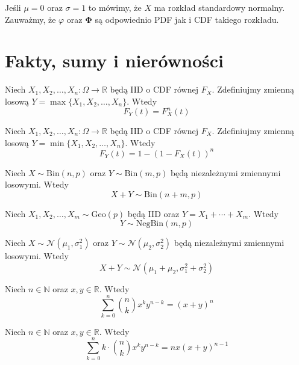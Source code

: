 Jeśli $\mu = 0$ oraz $\sigma = 1$ to mówimy, że $X$ ma rozkład standardowy normalny. Zauważmy, że $\varphi$ oraz $\mathbf{\Phi}$ są odpowiednio PDF jak i CDF takiego rozkładu.

\section{Fakty, sumy i nierówności}

\begin{fact}\label{fact:max_CDF}
Niech $X_1,X_2,\dots, X_n:\Omega\to\mathbb{R}$ będą IID o CDF równej $F_X$. Zdefiniujmy zmienną losową $Y = \max\{X_1,X_2,\dots, X_n\}$. Wtedy 
\[
    F_Y(t)=F_X^n(t)
\]
\end{fact}

\begin{fact}\label{fact:min_CDF}
Niech $X_1,X_2,\dots, X_n:\Omega\to\mathbb{R}$ będą IID o CDF równej $F_X$. Zdefiniujmy zmienną losową $Y = \min\{X_1,X_2,\dots, X_n\}$. Wtedy 
\[
    F_Y(t)=1-{(1-F_X(t))}^n
\]
\end{fact}

\begin{fact}\label{fact:sum_of_bin_RV}
Niech $X \sim \mathrm{Bin}(n,p)$ oraz $Y \sim \mathrm{Bin}(m,p)$ będą niezależnymi zmiennymi losowymi. Wtedy 
\[
    X + Y \sim \mathrm{Bin}(n+m, p)
\]
\end{fact}

\begin{fact}\label{fact:sum_of_geo_RV}
Niech $X_1, X_2, \dots, X_m \sim \mathrm{Geo}(p)$ będą IID oraz $Y=X_1 +  \cdots + X_m$. Wtedy 
\[
    Y \sim \mathrm{NegBin}(m, p)
\]
\end{fact}

\begin{fact}\label{fact:sum_of_normal_RV}
Niech $X \sim \mathcal{N}(\mu_1,\sigma_1^2)$ oraz $Y \sim \mathcal{N}(\mu_2,\sigma_2^2)$ będą niezależnymi zmiennymi losowymi. Wtedy 
\[
    X + Y \sim \mathcal{N}(\mu_1+\mu_2,\sigma_1^2+\sigma_2^2)
\]
\end{fact}

\begin{summ}\label{summ:binomial_0}
Niech $n\in\mathbb{N}$ oraz $x,y\in\mathbb{R}$. Wtedy
\[
    \sum_{k=0}^{n} \binom{n}{k} x^k y^{n-k}= {(x+y)}^n
\]
\end{summ}

\begin{summ}\label{summ:binomial_1}
Niech $n\in\mathbb{N}$ oraz $x,y\in\mathbb{R}$. Wtedy
\[
    \sum_{k=0}^{n} k\cdot\binom{n}{k} x^k y^{n-k} = nx{(x+y)}^{n-1}
\]
\end{summ}

